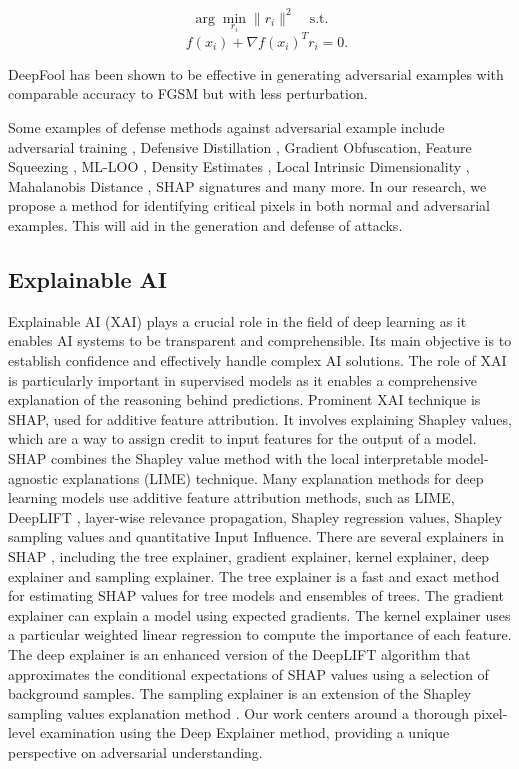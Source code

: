 \documentclass[10pt, conference, a4paper, final]{IEEEtran}
\begin{document}
\begin{equation}
\arg\min_{r_i} \|r_i\|^2 \quad \text{s.t.} 
\end{equation}
\begin{equation}
\quad f(x_i) + \nabla f(x_i)^T r_i = 0.
\end{equation}

DeepFool has been shown to be effective in generating adversarial examples with comparable accuracy to FGSM but with less perturbation.



Some examples of defense methods against adversarial example include adversarial training \cite {Goodfellow.}, Defensive Distillation \cite {Papernot}, Gradient Obfuscation, Feature Squeezing \cite {Evans}, ML-LOO \cite {Yang}, Density Estimates \cite {Feinman}, Local Intrinsic Dimensionality \cite {Ma}, Mahalanobis Distance 
 \cite {Lee}, SHAP signatures \cite{Fidel, LinY, Stiff, E.Mosca, Tcydenova} and many more. In our research, we propose a method for identifying critical pixels in both normal and adversarial examples. This will aid in the generation and defense of attacks. 


\subsection{Explainable AI}

Explainable AI (XAI) plays a crucial role in the field of deep learning as it enables AI systems to be transparent and comprehensible. Its main objective is to establish confidence and effectively handle complex AI solutions. The role of XAI is particularly important in supervised models as it enables a comprehensive explanation of the reasoning behind predictions. Prominent XAI technique is SHAP, used for additive feature attribution. It involves explaining Shapley values, which are a way to assign credit to input features for the output of a model. SHAP combines the Shapley value method with the local interpretable model-agnostic explanations (LIME) \cite {Ribeiro} technique. Many explanation methods for deep learning models use additive feature attribution methods, such as LIME, DeepLIFT \cite {Shrikumar}, layer-wise relevance propagation, Shapley regression values, Shapley sampling values and quantitative Input Influence. There are several explainers in SHAP \cite {LundbergandS}, including the tree explainer, gradient explainer, kernel explainer, deep explainer and sampling explainer. The tree explainer is a fast and exact method for estimating SHAP values for tree models and ensembles of trees. The gradient explainer can explain a model using expected gradients. The kernel explainer uses a particular weighted linear regression to compute the importance of each feature. The deep explainer is an enhanced version of the DeepLIFT algorithm that approximates the conditional expectations of SHAP values using a selection of background samples. The sampling explainer is an extension of the Shapley sampling values explanation method \cite{ZhangK}. Our work centers around a thorough pixel-level examination using the Deep Explainer method, providing a unique perspective on adversarial understanding.
\end{document}

